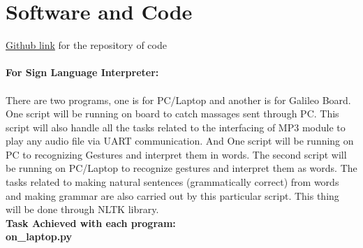 \documentclass[a4paper,12pt,oneside]{book}
\begin{document}
\section{Software and Code}
\href{https://github.com/eYSIP-2016/eYSIP-2016-Sign-Language-Interpreter-Leap-Motion-Sensor-}{Github link} for the repository of code\\
\vspace{.3cm}\\
\textbf{For Sign Language Interpreter:}\\
\vspace{.3cm}\\
There are two programs, one is for PC/Laptop and another is for Galileo Board. One script will be running on board to catch massages sent through PC. This script will also handle all the tasks related to the interfacing of MP3 module to play any audio file via UART communication. And One script will be running on PC to recognizing Gestures and interpret them in words. The second script will be running on PC/Laptop to recognize gestures and interpret them as words.
The tasks related to making natural sentences (grammatically correct) from words and making grammar are also carried out by this particular script. This thing will be done through NLTK library.\\
\vspace{.3cm}
\textbf{Task Achieved with each program:}
\vspace{1cm}\\
\textbf{\Large{on\_laptop.py}}\\
\end{document}
